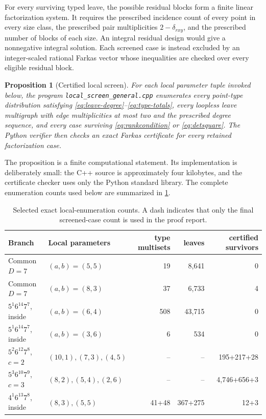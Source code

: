 \documentclass[11pt]{amsart}
\newtheorem{proposition}[theorem]{Proposition}
\begin{document}
For every surviving typed leave, the possible residual blocks form a finite linear factorization system. It requires the prescribed incidence count of every point in every size class, the prescribed pair multiplicities $2-\delta_{rxy}$, and the prescribed number of blocks of each size. An integral residual design would give a nonnegative integral solution. Each screened case is instead excluded by an integer-scaled rational Farkas vector whose inequalities are checked over every eligible residual block.

\begin{proposition}[Certified local screen]\label{prop:localscreen}
For each local parameter tuple invoked below, the program \texttt{local\_screen\_general.cpp} enumerates every point-type distribution satisfying \eqref{eq:leave-degree}--\eqref{eq:type-totals}, every loopless leave multigraph with edge multiplicities at most two and the prescribed degree sequence, and every case surviving \eqref{eq:rankcondition} or \eqref{eq:detsquare}. The Python verifier then checks an exact Farkas certificate for every retained factorization case.
\end{proposition}

The proposition is a finite computational statement. Its implementation is deliberately small: the C++ source is approximately four kilobytes, and the certificate checker uses only the Python standard library. The complete enumeration counts used below are summarized in \cref{tab:localcounts}.

\begin{table}[ht]
\centering
\small
\begin{tabular}{@{}llrrr@{}}
\toprule
Branch & Local parameters & type multisets & leaves & certified survivors\\
\midrule
Common $D=7$ & $(a,b)=(5,5)$ & 19 & 8,641 & 0\\
Common $D=7$ & $(a,b)=(8,3)$ & 37 & 6,733 & 4\\
$5^1 6^{14}7^7$, inside & $(a,b)=(6,4)$ & 508 & 43,715 & 0\\
$5^1 6^{14}7^7$, inside & $(a,b)=(3,6)$ & 6 & 534 & 0\\
$5^2 6^{12}7^8$, $c=2$ & $(10,1),(7,3),(4,5)$ & -- & -- & 195+217+28\\
$5^3 6^{10}7^9$, $c=3$ & $(8,2),(5,4),(2,6)$ & -- & -- & 4,746+656+3\\
$4^1 6^{13}7^8$, inside & $(8,3),(5,5)$ & 41+48 & 367+275 & 12+3\\
\bottomrule
\end{tabular}
\caption{Selected exact local-enumeration counts. A dash indicates that only the final screened-case count is used in the proof report.}
\label{tab:localcounts}
\end{table}
\end{document}
